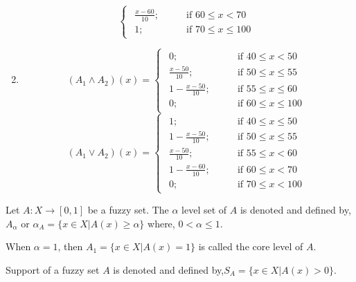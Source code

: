 \documentclass[../main-sheet.tex]{subfiles}
\begin{document}
\begin{ex}
\begin{enumerate}
\[\begin{cases}
\begin{aligned}
                    \frac{x-60}{10}; \qquad&\text{if }60\leq x<70\\
                    1; \qquad&\text{if }70\leq x\leq 100
                \end{aligned}
            \end{cases}
            \]
        \item 
        \[
            (A_1\wedge A_2)(x)=\begin{cases}
                \begin{aligned}
                    0; \qquad&\text{if }40\leq x<50\\
                    \frac{x-50}{10}; \qquad&\text{if }50\leq x\leq 55\\
                    1-\frac{x-50}{10}; \qquad&\text{if }55\leq x\leq 60\\
                    0; \qquad&\text{if }60\leq x\leq 100
                \end{aligned}
            \end{cases}
            \]
        \[
            (A_1\vee A_2)(x)=\begin{cases}
                \begin{aligned}
                    1; \qquad&\text{if }40\leq x\leq 50\\
                    1-\frac{x-50}{10}; \qquad&\text{if }50\leq x\leq 55\\
                    \frac{x-50}{10}; \qquad&\text{if }55\leq x< 60\\
                    1-\frac{x-60}{10}; \qquad&\text{if }60\leq x< 70\\
                    0; \qquad&\text{if }70\leq x< 100
                \end{aligned}
            \end{cases}
            \]
\end{enumerate}
\end{ex}
\begin{defn}
    Let \(A :X\to [0,1]\) be a fuzzy set. The \(\alpha\) level set of \(A \) is denoted and defined by, \(A_\alpha\) or \(\alpha_A=\{x\in X|A(x)\geq \alpha\}\) where, \(0<\alpha\leq 1\).
\end{defn}
\begin{defn}
    When \(\alpha=1\), then \(A_1=\{x\in X|A(x)=1\}\) is called the core level of \(A \).
\end{defn}
\begin{defn}
    Support of a fuzzy set \(A\) is denoted and defined by,\(S_A=\{x\in X|A(x)>0\}\).
\end{defn}
\end{document}
